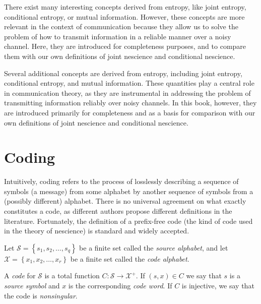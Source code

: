 There exist many interesting concepts derived from entropy, like joint entropy, conditional entropy, or mutual information. However, these concepts are more relevant in the context of communication because they allow us to solve the problem of how to transmit information in a reliable manner over a noisy channel. Here, they are introduced for completeness purposes, and to compare them with our own definitions of joint nescience and conditional nescience.

Several additional concepts are derived from entropy, including joint entropy, conditional entropy, and mutual information. These quantities play a central role in communication theory, as they are instrumental in addressing the problem of transmitting information reliably over noisy channels. In this book, however, they are introduced primarily for completeness and as a basis for comparison with our own definitions of joint nescience and conditional nescience.

%
%

\section{Coding}
\label{Codes}

Intuitively, coding refers to the process of losslessly describing a sequence of symbols (a message) from some alphabet by another sequence of symbols from a (possibly different) alphabet. There is no universal agreement on what exactly constitutes a code, as different authors propose different definitions in the literature. Fortunately, the definition of a prefix-free code (the kind of code used in the theory of nescience) is standard and widely accepted.

Let $\mathcal{S}=\left\{ s_{1},s_{2},\ldots,s_{q}\right\}$ be a finite set called the \emph{source alphabet}, and let $\mathcal{X}=\left\{ x_{1}, x_{2}, \ldots, x_{r} \right\}$ be a finite set called the \emph{code alphabet}.

\begin{definition}[Code]
A \emph{code} for $\mathcal{S}$ is a total function $C:\mathcal{S}\rightarrow\mathcal{X}^{+}$. If $(s,x) \in C$ we say that $s$ is a \emph{source symbol} and $x$ is the corresponding \emph{code word}. If $C$ is injective, we say that the code is \emph{nonsingular}.
\end{definition}

